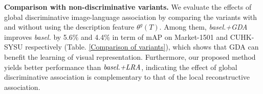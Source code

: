 \documentclass[runningheads]{llncs}
\begin{document}
 \noindent \textbf{Comparison with non-discriminative variants.} We evaluate the effects of global discriminative image-language association by comparing the variants with and without using the description feature $\theta^{g}(T)$.  Among them, \emph{basel.+GDA} improves \emph{basel.} by 5.6\% and 4.4\% in term of mAP on Market-1501 and CUHK-SYSU respectively (Table. \ref{Comparison of variants}), which shows that GDA can benefit the learning of visual representation. Furthermore, our proposed method  yields better performance than $ \emph{basel.+LRA}$, indicating the effect of global discriminative association is complementary to that of the local reconstructive association. 
 
 
 \begin{table}[b] \vspace{-1em}
\setlength{\tabcolsep}{6pt}
 \begin{center}
 \end{center}
 \caption{ Importance analysis of $\mathcal{L}_{T}$ in  \emph{basel.+GDA}. We fix $\lambda_{dis}=1$ and adjust $\lambda_{T}$ over 0, 0.05, 0.1, 0.5, 1.  Top-1,-5,-10 accuracies (\%) and mAP(\%) are reported.} \label{Comparison of parameters}
\end{table} 
\end{document}
